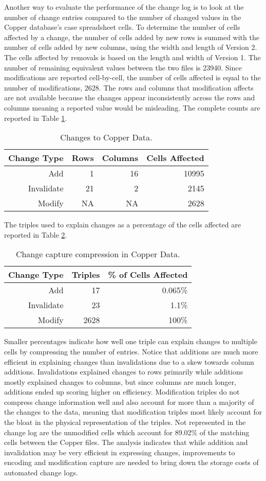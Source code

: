 Another way to evaluate the performance of the change log is to look at the number of change entries compared to the number of changed values in the Copper database's case spreadsheet cells.
To determine the number of cells affected by a change, the number of cells added by new rows is summed with the number of cells added by new columns, using the width and length of Version 2.
The cells affected by removals is based on the length and width of Version 1.
The number of remaining equivalent values between the two files is 23940.
Since modifications are reported cell-by-cell, the number of cells affected is equal to the number of modifications, 2628.
The rows and columns that modification affects are not available because the changes appear inconsistently across the rows and columns meaning a reported value would be misleading.
The complete counts are reported in Table \ref{table:Cu_cells}.
\begin{table}
	\caption{Changes to Copper Data.}
	\label{table:Cu_cells}
	\centering
	\begin{tabular}{@{}rrrr@{}}
		\toprule
		Change Type&	Rows&	Columns&	Cells Affected\\ \midrule
		Add&	1&	16&	10995\\
		Invalidate&	21&	2&	2145\\
		Modify&NA&NA& 2628\\
		\bottomrule
	\end{tabular}
\end{table}

The triples used to explain changes as a percentage of the cells affected are reported in Table \ref{table:Cu_change}.
\begin{table}
	\caption{Change capture compression in Copper Data.}
	\label{table:Cu_change}
	\centering
	\begin{tabular}{@{}rrr@{}}
		\toprule
		Change Type&	Triples&	\% of Cells Affected\\ \midrule
		Add&	17&	0.065\%\\
		Invalidate&	23&	1.1\%\\
		Modify&	2628&	100\%\\
		\bottomrule
	\end{tabular}
\end{table}
Smaller percentages indicate how well one triple can explain changes to multiple cells by compressing the number of entries.
Notice that additions are much more efficient in explaining changes than invalidations due to a skew towards column additions.
Invalidations explained changes to rows primarily while additions mostly explained changes to columns, but since columns are much longer, additions ended up scoring higher on efficiency.
Modification triples do not compress change information well and also account for more than a majority of the changes to the data, meaning that modification triples most likely account for the bloat in the physical representation of the triples.
Not represented in the change log are the unmodified cells which account for 89.02\% of the matching cells between the Copper files.
The analysis indicates that while addition and invalidation may be very efficient in expressing changes, improvements to encoding and modification capture are needed to bring down the storage costs of automated change logs.
